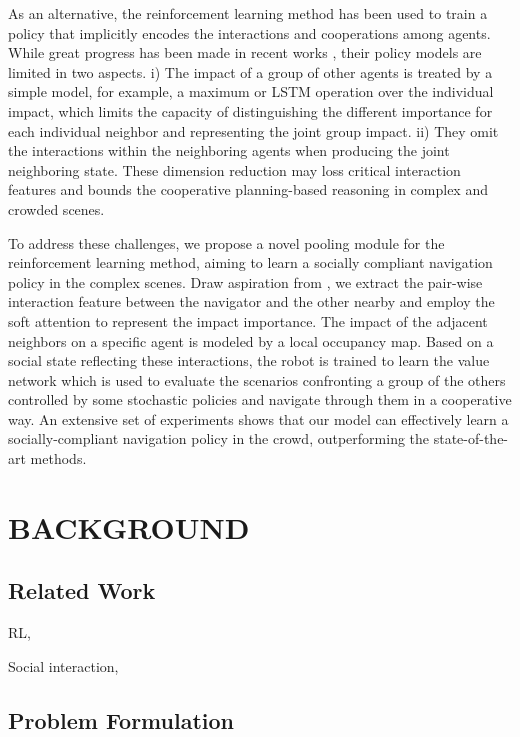 \documentclass[letterpaper, 10 pt, conference]{ieeeconf}  %
\begin{document}
As an alternative, the reinforcement learning method has been used to train a policy that implicitly encodes the interactions and cooperations among agents. While great progress has been made in recent works \cite{chen_decentralized_2016,chen_socially_2017,long_towards_2017,everett_motion_2018}, their policy models are limited in two aspects. i) The impact of a group of other agents is treated by a simple model, for example, a maximum or LSTM operation over the individual impact, which limits the capacity of distinguishing the different importance for each individual neighbor and representing the joint group impact. ii) They omit the interactions within the neighboring agents when producing the joint neighboring state. These dimension reduction may loss critical interaction features and bounds the cooperative planning-based reasoning in complex and crowded scenes. 

To address these challenges, we propose a novel pooling module for the reinforcement learning method, aiming to learn a socially compliant navigation policy in the complex scenes. Draw aspiration from \cite{gupta_social_2018,vemula_social_2017}, we extract the pair-wise interaction feature between the navigator and the other nearby and employ the soft attention to represent the impact importance. The impact of the adjacent neighbors on a specific agent is modeled by a local occupancy map. Based on a social state reflecting these interactions, the robot is trained to learn the value network which is used to evaluate the scenarios confronting a group of the others controlled by some stochastic policies and navigate through them in a cooperative way. An extensive set of experiments shows that our model can effectively learn a socially-compliant navigation policy in the crowd, outperforming the state-of-the-art methods. 

\section{BACKGROUND} \label{sec:background} 

\subsection{Related Work}

RL, 
\vspace{2cm}

Social interaction, 
\vspace{2cm}

\subsection{Problem Formulation}
\end{document}
